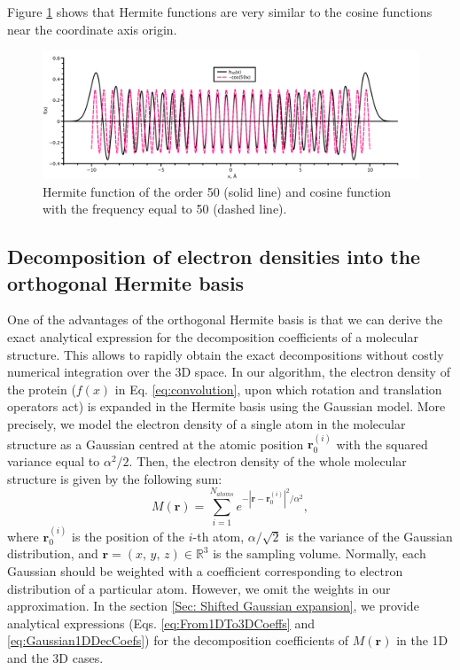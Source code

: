 Figure \ref{fig:HermiteSin} shows that Hermite functions are very similar to the cosine functions near the coordinate axis origin. 

\begin{figure}[H]
 \label{fig:HermiteSin}
\begin{centering}
\includegraphics[width=1\textwidth]{Hermite/Fig/H50}
\end{centering}
\caption[Hermite functions and sine function]{Hermite function of the order 50 (solid line) and cosine function with the frequency equal to 50 (dashed line).}
\end{figure}

\subsection{Decomposition of electron densities into the orthogonal Hermite basis}
One of the advantages of the orthogonal Hermite basis is that we can
derive the exact analytical expression for the decomposition coefficients
of a molecular structure. This allows to rapidly obtain the exact
decompositions without costly numerical integration over the 3D space.
In our algorithm, the electron density of the protein ($f(x)$ in Eq. \ref{eq:convolution}, upon which rotation and translation operators act) 
is expanded in the Hermite basis using the Gaussian model.
More precisely, we model the electron density of a single atom in the molecular
structure as a Gaussian centred at the atomic position $\mathbf{r}_{0}^{(i)}$
with the squared variance equal to $\alpha^{2}/2$. Then, the electron
density of the whole molecular structure is given by the following
sum:
%
\begin{equation}
M(\mathbf{r})=\sum_{i=1}^{N_{atoms}}e^{-|\mathbf{r}-\mathbf{r}_{0}^{(i)}|^{2}/\alpha^{2}},\label{eq:protein_density}
\end{equation}
where $\mathbf{r}_{0}^{(i)}$ is the position of the $i$-th atom,
$\alpha/\sqrt{2}$ is the variance of the Gaussian distribution, and
$\mathbf{r}=(x,\, y,\, z)\in \mathbb{R}^{3}$ is the sampling volume. 
Normally, each Gaussian should be weighted with a coefficient corresponding to electron distribution of a particular atom. However, we omit the weights in our approximation.
In the section \ref{Sec: Shifted Gaussian expansion}, we provide analytical expressions (Eqs. \ref{eq:From1DTo3DCoeffs} and \ref{eq:Gaussian1DDecCoefs})
for the decomposition coefficients of $M(\mathbf{r})$ in the 1D and
the 3D cases.

